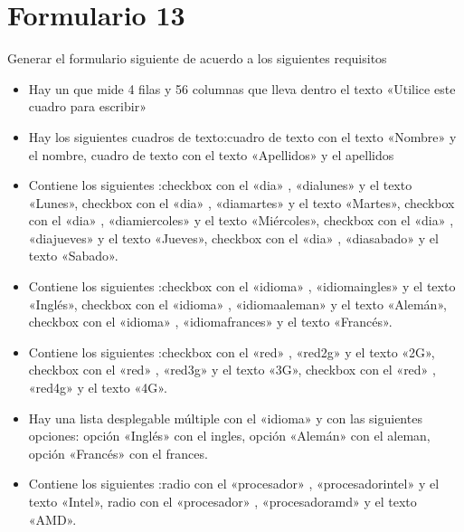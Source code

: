 \documentclass[letterpaper,10pt,spanish]{sphinxmanual}
\begin{document}
\section{Formulario 13}
\label{\detokenize{ejercicios/formularios/anexo_formularios:formulario-13}}
Generar el formulario siguiente de acuerdo a los siguientes requisitos
\begin{itemize}
\item {} 
Hay un  que mide 4 filas y 56 columnas que lleva dentro el texto «Utilice este cuadro para escribir»

\item {} 
Hay los siguientes cuadros de texto:cuadro de texto con el texto «Nombre» y el  nombre, cuadro de texto con el texto «Apellidos» y el  apellidos

\item {} 
Contiene los siguientes :checkbox con el   «dia» ,   «dialunes»  y el texto «Lunes», checkbox con el   «dia» ,   «diamartes»  y el texto «Martes», checkbox con el   «dia» ,   «diamiercoles»  y el texto «Miércoles», checkbox con el   «dia» ,   «diajueves»  y el texto «Jueves», checkbox con el   «dia» ,   «diasabado»  y el texto «Sabado».

\item {} 
Contiene los siguientes :checkbox con el   «idioma» ,   «idiomaingles»  y el texto «Inglés», checkbox con el   «idioma» ,   «idiomaaleman»  y el texto «Alemán», checkbox con el   «idioma» ,   «idiomafrances»  y el texto «Francés».

\item {} 
Contiene los siguientes :checkbox con el   «red» ,   «red2g»  y el texto «2G», checkbox con el   «red» ,   «red3g»  y el texto «3G», checkbox con el   «red» ,   «red4g»  y el texto «4G».

\item {} 
Hay una lista desplegable múltiple con el  «idioma» y con las siguientes opciones: opción «Inglés» con el  ingles, opción «Alemán» con el  aleman, opción «Francés» con el  frances.

\item {} 
Contiene los siguientes :radio con el   «procesador» ,   «procesadorintel»  y el texto «Intel», radio con el   «procesador» ,   «procesadoramd»  y el texto «AMD».

\end{itemize}
\end{document}
